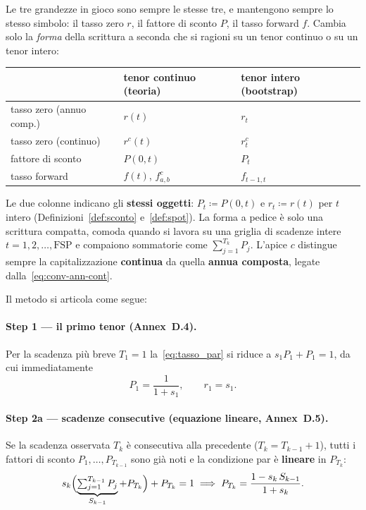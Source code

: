 \documentclass[11pt,a4paper]{article}
\theoremstyle{plain}
\theoremstyle{definition}
\theoremstyle{remark}
\newcommand{\FSP}{\mathrm{FSP}}
\newcommand{\defeq}{\coloneqq}
\begin{document}
\begin{keybox}
\label{box:notazione}
Le tre grandezze in gioco sono sempre le stesse tre, e mantengono sempre lo stesso simbolo:
il tasso zero $r$, il fattore di sconto $P$, il tasso forward $f$. Cambia solo la
\emph{forma} della scrittura a seconda che si ragioni su un tenor continuo o su un tenor
intero:
\begin{center}
\renewcommand{\arraystretch}{1.25}
\begin{tabular}{lll}
\toprule
 & \textbf{tenor continuo} (teoria) & \textbf{tenor intero} (bootstrap)\\
\midrule
\rowcolor{rowtint} tasso zero (annuo comp.) & $r(t)$ & $r_t$\\
tasso zero (continuo)    & $r^c(t)$ & $r^c_t$\\
\rowcolor{rowtint} fattore di sconto & $P(0,t)$ & $P_t$\\
tasso forward & $f(t)$, $f^c_{a,b}$ & $f_{t-1,t}$\\
\bottomrule
\end{tabular}
\end{center}
Le due colonne indicano gli \textbf{stessi oggetti}: $P_t \defeq P(0,t)$ e
$r_t \defeq r(t)$ per $t$ intero (Definizioni~\ref{def:sconto} e~\ref{def:spot}). La forma a
pedice \`e solo una scrittura compatta, comoda quando si lavora su una griglia di scadenze
intere $t=1,2,\ldots,\FSP$ e compaiono sommatorie come $\sum_{j=1}^{T_k} P_j$. L'apice $c$
distingue sempre la capitalizzazione \textbf{continua} da quella \textbf{annua composta},
legate dalla~\eqref{eq:conv-ann-cont}.
\end{keybox}

Il metodo si articola come segue:
\paragraph{Step 1 --- il primo tenor (Annex~D.4).}
Per la scadenza pi\`u breve $T_1=1$ la~\eqref{eq:tasso_par} si riduce a $s_1 P_1+P_1=1$, da
cui immediatamente
\begin{equation}
  \label{eq:step1}
  P_1 = \frac{1}{1+s_1}, \qquad r_1 = s_1.
\end{equation}

\paragraph{Step 2a --- scadenze consecutive (equazione lineare, Annex~D.5).}
Se la scadenza osservata $T_{k}$ \`e consecutiva alla precedente ($T_{k}=T_{k-1}+1$), tutti i
fattori di sconto $P_1,\dots,P_{T_{k-1}}$ sono gi\`a noti e la condizione par \`e
\textbf{lineare} in $P_{T_k}$:
\begin{equation}
  \label{eq:step2-lin}
  s_{k}\Bigl(\underbrace{\textstyle\sum_{j=1}^{T_{k-1}} P_j}_{S_{k-1}} + P_{T_k}\Bigr)
  + P_{T_k} = 1
  \;\Longrightarrow\;
  P_{T_k} = \frac{1 - s_{k}\,S_{k-1}}{1 + s_{k}}.
\end{equation}
\end{document}
